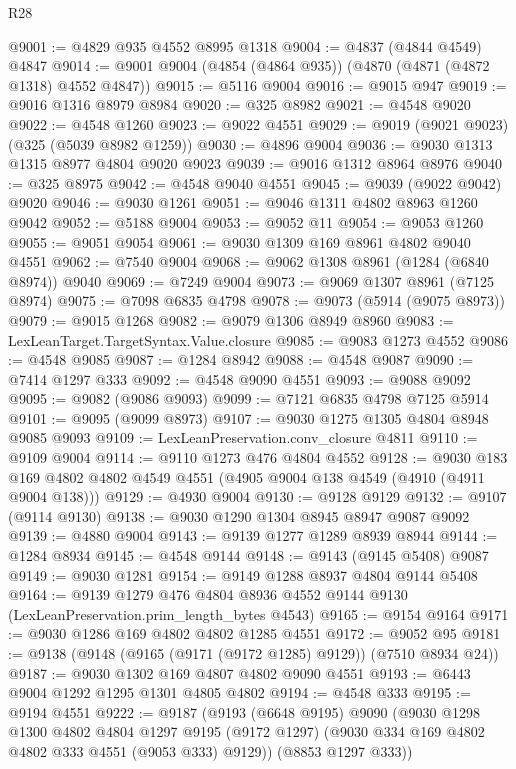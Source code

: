 \begin{lexlean}{R28}
\begin{coremodule}
@9001 := @4829 @935 @4552 @8995 @1318
@9004 := @4837 (@4844 @4549) @4847
@9014 := @9001 @9004 (@4854 (@4864 @935)) (@4870 (@4871 (@4872 @1318) @4552 @4847))
@9015 := @5116 @9004
@9016 := @9015 @947
@9019 := @9016 @1316 @8979 @8984
@9020 := @325 @8982
@9021 := @4548 @9020
@9022 := @4548 @1260
@9023 := @9022 @4551
@9029 := @9019 (@9021 @9023) (@325 (@5039 @8982 @1259))
@9030 := @4896 @9004
@9036 := @9030 @1313 @1315 @8977 @4804 @9020 @9023
@9039 := @9016 @1312 @8964 @8976
@9040 := @325 @8975
@9042 := @4548 @9040 @4551
@9045 := @9039 (@9022 @9042) @9020
@9046 := @9030 @1261
@9051 := @9046 @1311 @4802 @8963 @1260 @9042
@9052 := @5188 @9004
@9053 := @9052 @11
@9054 := @9053 @1260
@9055 := @9051 @9054
@9061 := @9030 @1309 @169 @8961 @4802 @9040 @4551
@9062 := @7540 @9004
@9068 := @9062 @1308 @8961 (@1284 (@6840 @8974)) @9040
@9069 := @7249 @9004
@9073 := @9069 @1307 @8961 (@7125 @8974)
@9075 := @7098 @6835 @4798
@9078 := @9073 (@5914 (@9075 @8973))
@9079 := @9015 @1268
@9082 := @9079 @1306 @8949 @8960
@9083 := LexLeanTarget.TargetSyntax.Value.closure
@9085 := @9083 @1273 @4552
@9086 := @4548 @9085
@9087 := @1284 @8942
@9088 := @4548 @9087
@9090 := @7414 @1297 @333
@9092 := @4548 @9090 @4551
@9093 := @9088 @9092
@9095 := @9082 (@9086 @9093)
@9099 := @7121 @6835 @4798 @7125 @5914
@9101 := @9095 (@9099 @8973)
@9107 := @9030 @1275 @1305 @4804 @8948 @9085 @9093
@9109 := LexLeanPreservation.conv_closure @4811
@9110 := @9109 @9004
@9114 := @9110 @1273 @476 @4804 @4552
@9128 := @9030 @183 @169 @4802 @4802 @4549 @4551 (@4905 @9004 @138 @4549 (@4910 (@4911 @9004 @138)))
@9129 := @4930 @9004
@9130 := @9128 @9129
@9132 := @9107 (@9114 @9130)
@9138 := @9030 @1290 @1304 @8945 @8947 @9087 @9092
@9139 := @4880 @9004
@9143 := @9139 @1277 @1289 @8939 @8944
@9144 := @1284 @8934
@9145 := @4548 @9144
@9148 := @9143 (@9145 @5408) @9087
@9149 := @9030 @1281
@9154 := @9149 @1288 @8937 @4804 @9144 @5408
@9164 := @9139
    @1279
    @476
    @4804
    @8936
    @4552
    @9144
    @9130
    (LexLeanPreservation.prim_length_bytes @4543)
@9165 := @9154 @9164
@9171 := @9030 @1286 @169 @4802 @4802 @1285 @4551
@9172 := @9052 @95
@9181 := @9138 (@9148 (@9165 (@9171 (@9172 @1285) @9129)) (@7510 @8934 @24))
@9187 := @9030 @1302 @169 @4807 @4802 @9090 @4551
@9193 := @6443 @9004 @1292 @1295 @1301 @4805 @4802
@9194 := @4548 @333
@9195 := @9194 @4551
@9222 := @9187
    (@9193
      (@6648 @9195)
      @9090
      (@9030
        @1298
        @1300
        @4802
        @4804
        @1297
        @9195
        (@9172 @1297)
        (@9030 @334 @169 @4802 @4802 @333 @4551 (@9053 @333) @9129))
      (@8853 @1297 @333))

\end{coremodule}
\end{lexlean}
